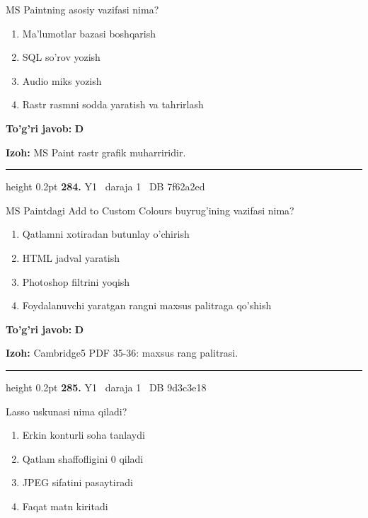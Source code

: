 \documentclass[10pt,a4paper,oneside]{article}
\begin{document}
\par
MS Paintning asosiy vazifasi nima?
\begin{enumerate}[label=\Alph*),leftmargin=9mm]
\item Ma'lumotlar bazasi boshqarish
\item SQL so'rov yozish
\item Audio miks yozish
\item Rastr rasmni sodda yaratish va tahrirlash
\end{enumerate}
\begin{tcolorbox}[enhanced,breakable,colback=teal!4,colframe=teal!45!black,boxrule=0.45pt,arc=1.2mm,left=2.8mm,right=2.8mm,top=2mm,bottom=2mm,before skip=2mm,after skip=2mm]
\textbf{\color{teal}To'g'ri javob:} \textbf{D}
\par\smallskip
\textbf{Izoh:} MS Paint rastr grafik muharriridir.
\end{tcolorbox}
\vspace{2mm}\hrule height 0.2pt \vspace{4mm}
\hypertarget{q284}{\textbf{\color{ink}284.}}  {\color{muted}\scriptsize Y1 \textbullet\ daraja 1 \textbullet\ DB 7f62a2ed}
\par
MS Paintdagi Add to Custom Colours buyrug'ining vazifasi nima?
\begin{enumerate}[label=\Alph*),leftmargin=9mm]
\item Qatlamni xotiradan butunlay o'chirish
\item HTML jadval yaratish
\item Photoshop filtrini yoqish
\item Foydalanuvchi yaratgan rangni maxsus palitraga qo'shish
\end{enumerate}
\begin{tcolorbox}[enhanced,breakable,colback=teal!4,colframe=teal!45!black,boxrule=0.45pt,arc=1.2mm,left=2.8mm,right=2.8mm,top=2mm,bottom=2mm,before skip=2mm,after skip=2mm]
\textbf{\color{teal}To'g'ri javob:} \textbf{D}
\par\smallskip
\textbf{Izoh:} Cambridge5 PDF 35-36: maxsus rang palitrasi.
\end{tcolorbox}
\vspace{2mm}\hrule height 0.2pt \vspace{4mm}
\hypertarget{q285}{\textbf{\color{ink}285.}}  {\color{muted}\scriptsize Y1 \textbullet\ daraja 1 \textbullet\ DB 9d3c3e18}
\par
Lasso uskunasi nima qiladi?
\begin{enumerate}[label=\Alph*),leftmargin=9mm]
\item Erkin konturli soha tanlaydi
\item Qatlam shaffofligini 0 qiladi
\item JPEG sifatini pasaytiradi
\item Faqat matn kiritadi
\end{enumerate}
\end{document}
